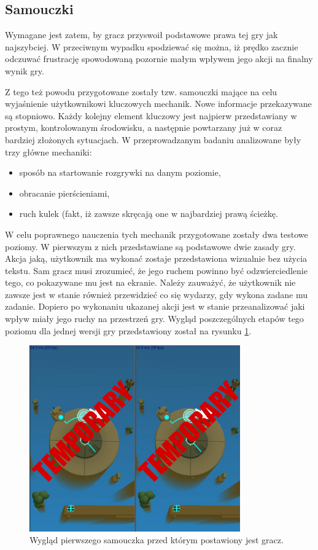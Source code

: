 \documentclass[a4paper,12pt,numbers=noenddot]{report}
\begin{document}
	\subsection{Samouczki}
Wymagane jest zatem, by gracz przyswoił podstawowe prawa tej gry jak najszybciej. W przeciwnym wypadku spodziewać się można, iż prędko zacznie odczuwać frustrację spowodowaną pozornie małym wpływem jego akcji na finalny wynik gry. 

Z tego też powodu przygotowane zostały tzw. samouczki mające na celu wyjaśnienie użytkownikowi kluczowych mechanik. Nowe informacje przekazywane są stopniowo. Każdy kolejny element kluczowy jest najpierw przedstawiany w prostym, kontrolowanym środowisku, a następnie powtarzany już w coraz bardziej złożonych sytuacjach. 
W przeprowadzanym badaniu analizowane były trzy główne mechaniki: 
\begin{itemize}
\item sposób na startowanie rozgrywki na danym poziomie, 
\item obracanie pierścieniami,
\item ruch kulek (fakt, iż zawsze skręcają one w najbardziej prawą ścieżkę.
\end{itemize}

W celu poprawnego nauczenia tych mechanik przygotowane zostały dwa testowe poziomy. W pierwszym z nich przedstawiane są podstawowe dwie zasady gry. Akcja jaką, użytkownik ma wykonać zostaje przedstawiona wizualnie bez użycia tekstu. Sam gracz musi zrozumieć, że jego ruchem powinno być odzwierciedlenie tego, co pokazywane mu jest na ekranie. Należy zauważyć, że użytkownik nie zawsze jest w stanie również przewidzieć co się wydarzy, gdy wykona zadane mu zadanie. Dopiero po wykonaniu ukazanej akcji jest w stanie przeanalizować jaki wpływ miały jego ruchy na przestrzeń gry.
Wygląd poszczególnych etapów tego poziomu dla jednej wersji gry przedstawiony został na rysunku \ref{fig:tut_L1_1}.

\begin{figure}[h!]
	\centering
  	\includegraphics[height=8cm]{fig/tmp2.jpg}
	\caption{Wygląd pierwszego samouczka przed którym postawiony jest gracz.}
	\label{fig:tut_L1_1}
\end{figure}
\end{document}
